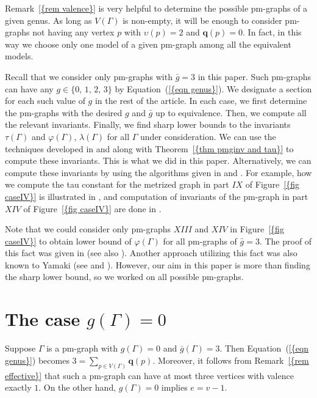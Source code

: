 \documentclass[12pt]{amsart}
\theoremstyle{example}
\theoremstyle{definition}
\theoremstyle{notation}
\begin{document}
{Remark~\ref{{rem valence}}} is very helpful to determine the possible pm-graphs of a given genus.
As long as ${V({\Gamma})}$ is non-empty, it will be enough to consider pm-graphs not having any vertex $p$ with ${\upsilon}(p)=2$ and ${\textbf{q}}(p)=0$.
In fact, in this way we choose only one model of a given pm-graph among all the equivalent models.

Recall that we consider only pm-graphs with ${\bar{g}} =3$ in this paper. Such pm-graphs can have any $g \in \{0,\, 1, \, 2, \, 3 \}$ by {Equation~(\ref{{eqn genus}})}. We designate a section for each such value of $g$ in the rest of the article. In each case, we first determine the pm-graphs with the desired $g$ and ${\bar{g}}$ up to equivalence. Then, we compute all the relevant invariants. Finally, we find sharp lower bounds to the invariants ${\tau(\Gamma)}$ and ${\varphi ({\Gamma})}$, ${\lambda ({\Gamma})}$ for all ${\Gamma}$ under consideration. We can use the techniques developed in \cite{C2} and \cite{C1} along with {Theorem~\ref{{thm pmginv and tau}}} to compute these invariants. This is what we did in this paper. Alternatively, we can compute these invariants by using the algorithms given in \cite{C6} and \cite{ZCGraphInvComp}. For example, how we compute the tau constant for the metrized graph in part $IX$ of {Figure~\ref{{fig caseIV}}} is illustrated in \cite[Example 5.2]{C6}, and computation of invariants of the pm-graph
in part $XIV$ of {Figure~\ref{{fig caseIV}}} are done in \cite[Example 1]{ZCGraphInvComp}.

Note that we could consider only pm-graphs $XIII$ and $XIV$ in {Figure~\ref{{fig caseIV}}} to obtain lower bound of ${\varphi ({\Gamma})}$ for all pm-graphs of ${\bar{g}}=3$. The proof of this fact was given in \cite[pages 360 and 365]{Fa} (see also \cite[pages 549 and 550]{C5}). Another approach utilizing this fact was also known to Yamaki (see \cite[page 67]{KY3} and \cite[page 160]{KY1}). However, our aim in this paper is more than finding the sharp lower bound, so we worked on all possible pm-graphs.

\section{The case $g({\Gamma}) = 0$}\label{sec caseI}

Suppose ${\Gamma}$ is a pm-graph with $g({\Gamma})=0$ and ${\bar{g}} ({\Gamma})=3$. Then {Equation~(\ref{{eqn genus}})} becomes $3=\sum_{p \in {V({\Gamma})}}{\textbf{q}} (p)$.
Moreover, it follows from {Remark~\ref{{rem effective}}} that such a pm-graph can have at most three vertices with valence exactly $1$. On the other hand, $g({\Gamma})=0$ implies $e=v-1$.
\end{document}
